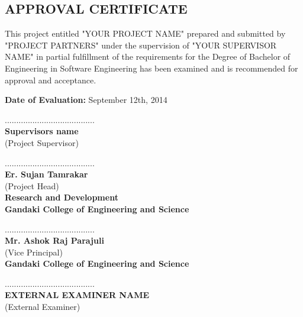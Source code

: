 \begin{center}
			\section*{APPROVAL CERTIFICATE}
		\end{center}
		This project entitled "YOUR PROJECT NAME" prepared and submitted by "PROJECT PARTNERS" under the supervision of "YOUR SUPERVISOR NAME" in partial fulfillment of the requirements for the Degree of Bachelor of Engineering in Software Engineering has been examined and is recommended for approval and acceptance.
\vskip0.1cm


\textbf{Date of Evaluation:} September 12th, 2014
\vskip0.5cm
	

....................................... \\
	\textbf{Supervisors name} \\
	(Project Supervisor)
	\vskip0.3cm
	
....................................... \\
\textbf{Er. Sujan Tamrakar} \\
(Project Head) \\
\textbf{Research and Development} \\
\textbf{Gandaki College of Engineering and Science}
\vskip0.3cm

....................................... \\
\textbf{Mr. Ashok Raj Parajuli} \\
(Vice Principal) \\
\textbf{Gandaki College of Engineering and Science}
\vskip0.3cm

....................................... \\
\textbf{EXTERNAL EXAMINER NAME} \\
(External Examiner) \\